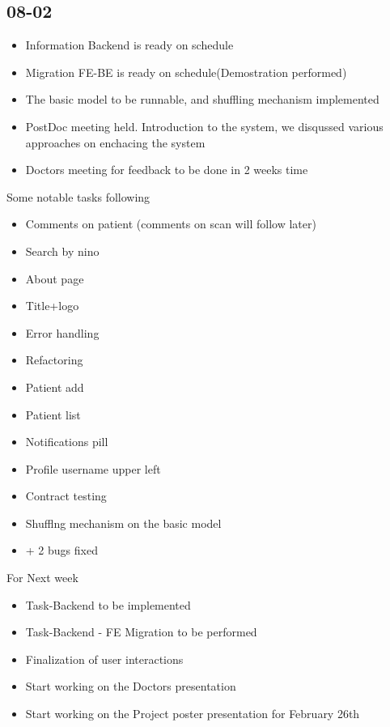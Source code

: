 \documentclass[openany]{article}
\begin{document}
		\subsection{08-02}
			\begin{itemize}
				
				\item Information Backend is ready on schedule
				\item Migration FE-BE is ready on schedule(Demostration performed)
				\item The basic model to be runnable, and shuffling mechanism implemented
				\item PostDoc meeting held. Introduction to the system, we disqussed various approaches on enchacing the system
				\item Doctors meeting for feedback to be done in 2 weeks time
			\end{itemize}
			Some notable tasks following
			\begin{itemize}
				\item Comments on patient (comments on scan will follow later)
				\item Search by nino
				\item About page
				\item Title+logo
				\item Error handling
				\item Refactoring
				\item Patient add
				\item Patient list
				\item Notifications pill
				\item Profile username upper left
				\item Contract testing
				\item Shufflng mechanism on the basic model
				\item + 2 bugs fixed
			\end{itemize}
			For Next week
			\begin{itemize}
				\item Task-Backend to be implemented
				\item Task-Backend - FE Migration to be performed
				\item Finalization of user interactions
				\item Start working on the Doctors presentation
				\item Start working on the Project poster presentation for February 26th
			\end{itemize}
\end{document}
